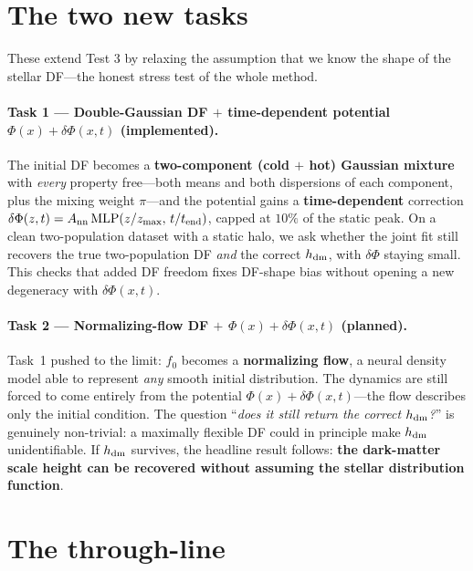 \documentclass[11pt]{article}
\newcommand{\hdm}{h_{\rm dm}}
\newcommand{\Phider}{\Phi}
\begin{document}
\section{The two new tasks}

These extend Test 3 by relaxing the assumption that we know the shape of the
stellar DF---the honest stress test of the whole method.

\paragraph{Task 1 --- Double-Gaussian DF $+$ time-dependent potential
$\Phider(x)+\delta\Phi(x,t)$ \textnormal{\small(implemented)}.}
The initial DF becomes a \textbf{two-component (cold $+$ hot) Gaussian mixture}
with \emph{every} property free---both means and both dispersions of each
component, plus the mixing weight $\pi$---and the potential gains a
\textbf{time-dependent} correction $\delta\Phi(z,t)=A_{\rm nn}\,\mathrm{MLP}
(z/z_{\max},\,t/t_{\rm end})$, capped at $10\%$ of the static peak. On a clean
two-population dataset with a static halo, we ask whether the joint fit still
recovers the true two-population DF \emph{and} the correct $\hdm$, with
$\delta\Phi$ staying small. This checks that added DF freedom fixes DF-shape bias
without opening a new degeneracy with $\delta\Phi(x,t)$.

\paragraph{Task 2 --- Normalizing-flow DF $+$ $\Phider(x)+\delta\Phi(x,t)$
\textnormal{\small(planned)}.}
Task~1 pushed to the limit: $f_0$ becomes a \textbf{normalizing flow}, a neural
density model able to represent \emph{any} smooth initial distribution. The
dynamics are still forced to come entirely from the potential
$\Phider(x)+\delta\Phi(x,t)$---the flow describes only the initial condition. The
question ``\emph{does it still return the correct $\hdm$?}'' is genuinely
non-trivial: a maximally flexible DF could in principle make $\hdm$
unidentifiable. If $\hdm$ survives, the headline result follows: \textbf{the
dark-matter scale height can be recovered without assuming the stellar
distribution function}.

\section{The through-line}
\end{document}
